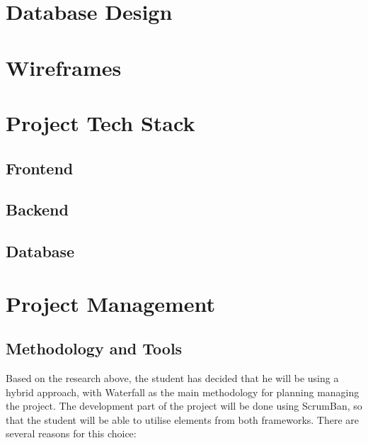 \FloatBarrier

\noindent\begin{minipage}{\textwidth}
    \section{Database Design}
    \begin{center}
        \label{fig:erd}
    \end{center}
\end{minipage}

\FloatBarrier

\section{Wireframes}

\section{Project Tech Stack}

\subsection{Frontend}

\subsection{Backend}

\subsection{Database}

\section{Project Management}

\subsection{Methodology and Tools}

Based on the research above, the student has decided that he will be using a hybrid approach, with Waterfall as the main methodology for planning managing the project. The development part of the project will be done using ScrumBan, so that the student will be able to utilise elements from both frameworks. There are several reasons for this choice:

